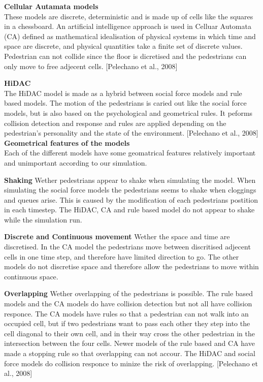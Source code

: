 \textbf{Cellular Autamata models}\\
These models are discrete, deterministic and is made up of cells like the squares in a chessboard.
An artificial intelligence approach is used in Celluar Automata (CA) defined as mathematical idealisation of physical systems in which time and space are
discrete, and physical quantities take a finite set of discrete values. Pedestrian can not collide since the floor is dicretised and the pedestrians can
only move to free adjecent cells. [Pelechano et al., 2008] %

\textbf{HiDAC}\\
The HiDAC model is made as a hybrid between social force models and rule based models. 
The motion of the pedestrians is caried out like the social force models, but is also based 
on the psychological and geometrical rules. It peforms collision detection and response and rules 
are applied depending on the pedestrian's personality and the state of the environment. 
[Pelechano et al., 2008] %
\\

\textbf{Geometrical features of the models}\\
Each of the different models have some geomatrical features relatively important and 
unimportant according to our simulation.

\textbf{Shaking} Wether pedestrians appear to shake when simulating the model. When 
simulating the social force models the pedestrians seems to shake when cloggings and 
queues arise. This is caused by the modification of each pedestrians postition in each 
timestep. The HiDAC, CA and rule based model do not appear to shake while the simulation run.

\textbf{Discrete and Continuous movement} Wether the space and time are discretised. In the CA model the pedestrians move between discritised adjecent
cells in one time step, and therefore have limited direction to go. The other models do not discretise space and therefore allow the pedestrians to move
within continuous space.
 
\textbf{Overlapping} Wether overlapping of the pedestrians is possible. The rule based models and the CA models do have collision detection but not
all have collision responce. The CA models have rules so that a pedestrian can not walk into an occupied cell, but if two pedestrians want to pass each
other they step into the cell diagonal to their own cell, and in their way cross the other pedestrian in the intersection between the four cells.
Newer models of the rule based and CA have made a stopping rule so that overlapping can not accour. The HiDAC and social force models do collision responce
to minize the risk of overlapping. [Pelechano et al., 2008]

